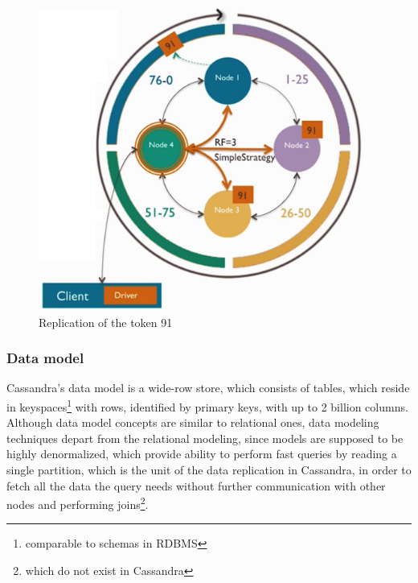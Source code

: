 \begin{figure}[h]
	\centering
	\includegraphics[height=100mm]{images/cassandra-replication-ring.png}\hspace{10mm}
	\caption{Replication of the token 91}
	\label{fig:replicationRing}
\end{figure}





\subsubsection{Data model}
\label{sec:theory:cassandra:datamodel}
Cassandra's data model is a wide-row store, which consists of tables, which reside in keyspaces\footnote{comparable to schemas in RDBMS} with rows, identified by primary keys, with up to 2 billion columns. Although data model concepts are similar to relational ones, data modeling techniques depart from the relational modeling, since models are supposed to be highly denormalized, which provide ability to perform fast queries by reading a single partition, which is the unit of the data replication in Cassandra, in order to fetch all the data the query needs without further communication with other nodes and performing joins\footnote{which do not exist in Cassandra}.

